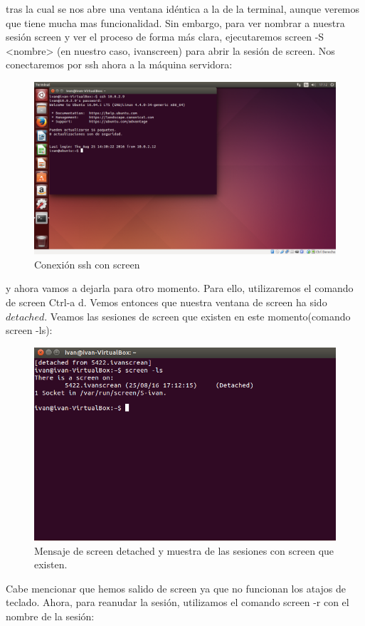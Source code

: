 tras la cual se nos abre una ventana idéntica a la de la terminal, aunque veremos que tiene mucha mas funcionalidad. Sin embargo, para ver nombrar a nuestra sesión screen y ver el proceso de forma más clara, ejecutaremos screen -S <nombre> (en nuestro caso, ivanscreen) para abrir la sesión de screen. Nos conectaremos por ssh ahora a la máquina servidora:\\

\begin{figure}[H]
	\centering
	\includegraphics[width=0.7\linewidth]{screenSshNormal}
	\caption[Conexión ssh con screen]{Conexión ssh con screen}
	\label{fig:ScreenSshConection}
\end{figure}

y ahora vamos a dejarla para otro momento. Para ello, utilizaremos el comando de screen Ctrl-a d. Vemos entonces que nuestra ventana de screen ha sido $detached$. Veamos las sesiones de screen que existen en este momento(comando screen -ls):\\

\begin{figure}[H]
	\centering
	\includegraphics[width=0.7\linewidth]{ScreenDetached}
	\caption[Screen Detached]{Mensaje de screen detached y muestra de las sesiones con screen que existen.}
	\label{fig:ScreenDetached}
\end{figure}

Cabe mencionar que hemos salido de screen ya que no funcionan los atajos de teclado. Ahora, para reanudar la sesión, utilizamos el comando screen -r con el nombre de la sesión:\\

